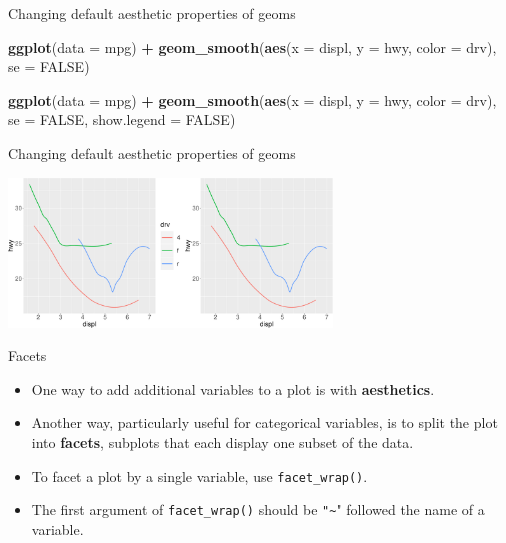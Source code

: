 \documentclass[ignorenonframetext,]{beamer}
\newenvironment{Shaded}{\begin{snugshade}}{\end{snugshade}}
\newcommand{\DataTypeTok}[1]{\textcolor[rgb]{0.13,0.29,0.53}{#1}}
\newcommand{\KeywordTok}[1]{\textcolor[rgb]{0.13,0.29,0.53}{\textbf{#1}}}
\newcommand{\NormalTok}[1]{#1}
\newcommand{\OperatorTok}[1]{\textcolor[rgb]{0.81,0.36,0.00}{\textbf{#1}}}
\newcommand{\OtherTok}[1]{\textcolor[rgb]{0.56,0.35,0.01}{#1}}
\newcommand{\StringTok}[1]{\textcolor[rgb]{0.31,0.60,0.02}{#1}}
\begin{document}
\begin{frame}[fragile]{Changing default aesthetic properties of geoms}
\protect\hypertarget{changing-default-aesthetic-properties-of-geoms-36}{}

\begin{Shaded}
\begin{Highlighting}[]
\KeywordTok{ggplot}\NormalTok{(}\DataTypeTok{data =}\NormalTok{ mpg) }\OperatorTok{+}\StringTok{ }
\StringTok{  }\KeywordTok{geom_smooth}\NormalTok{(}\KeywordTok{aes}\NormalTok{(}\DataTypeTok{x =}\NormalTok{ displ, }\DataTypeTok{y =}\NormalTok{ hwy, }\DataTypeTok{color =}\NormalTok{ drv),}
    \DataTypeTok{se =} \OtherTok{FALSE}\NormalTok{)}

\KeywordTok{ggplot}\NormalTok{(}\DataTypeTok{data =}\NormalTok{ mpg) }\OperatorTok{+}\StringTok{ }
\StringTok{  }\KeywordTok{geom_smooth}\NormalTok{(}\KeywordTok{aes}\NormalTok{(}\DataTypeTok{x =}\NormalTok{ displ, }\DataTypeTok{y =}\NormalTok{ hwy, }\DataTypeTok{color =}\NormalTok{ drv),}
    \DataTypeTok{se =} \OtherTok{FALSE}\NormalTok{, }\DataTypeTok{show.legend =} \OtherTok{FALSE}\NormalTok{)}
\end{Highlighting}
\end{Shaded}

\end{frame}

\begin{frame}{Changing default aesthetic properties of geoms}
\protect\hypertarget{changing-default-aesthetic-properties-of-geoms-37}{}

\begin{center}\includegraphics[height=150px]{data-visualization_files/figure-beamer/unnamed-chunk-69-1} \end{center}

\end{frame}

\begin{frame}[fragile]{Facets}
\protect\hypertarget{facets}{}

\begin{itemize}
\item
  One way to add additional variables to a plot is with
  \textbf{aesthetics}.
\item
  Another way, particularly useful for categorical variables, is to
  split the plot into \textbf{facets}, subplots that each display one
  subset of the data.
\item
  To facet a plot by a single variable, use \texttt{facet\_wrap()}.
\item
  The first argument of \texttt{facet\_wrap()} should be
  \texttt{"\textasciitilde{}}" followed the name of a variable.
\end{itemize}

\end{frame}
\end{document}
